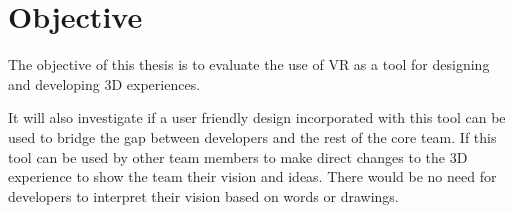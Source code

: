 \section{Objective}
The objective of this thesis is to evaluate the use of VR as a tool for designing and developing 3D experiences.

It will also investigate if a user friendly design incorporated with this tool can be used to bridge the gap between developers and the rest of the core team. If this tool  can be used by other team members to make direct changes to the 3D experience to show the team their vision and ideas. There would be no need for developers to interpret their vision based on words or drawings.

